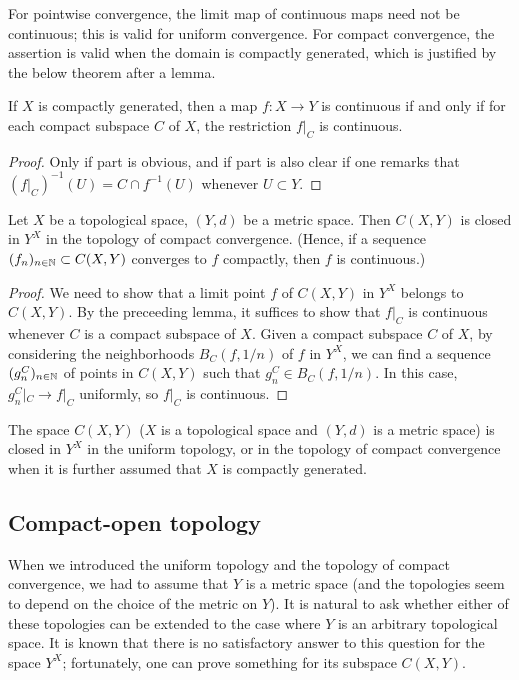 For pointwise convergence, the limit map of continuous maps need not be continuous; this is valid for uniform convergence.
For compact convergence, the assertion is valid when the domain is compactly generated, which is justified by the below theorem after a lemma.
\begin{lem}
    If $X$ is compactly generated, then a map $f: X\rightarrow Y$ is continuous if and only if for each compact subspace $C$ of $X$, the restriction $f|_C$ is continuous.
\end{lem}
\begin{proof}
    Only if part is obvious, and if part is also clear if one remarks that $(f|_C)^{-1}(U)=C\cap f^{-1}(U)$ whenever $U\subset Y$.
\end{proof}
\begin{thm}
    Let $X$ be a topological space, $(Y, d)$ be a metric space.
    Then $C(X, Y)$ is closed in $Y^X$ in the topology of compact convergence.
    (Hence, if a sequence $(f_n)_{n\in{\mathbb{N}}}\subset C(X, Y)$ converges to $f$ compactly, then $f$ is continuous.)
\end{thm}
\begin{proof}
    We need to show that a limit point $f$ of $C(X, Y)$ in $Y^X$ belongs to $C(X, Y)$.
    By the preceeding lemma, it suffices to show that $f|_C$ is continuous whenever $C$ is a compact subspace of $X$.
    Given a compact subspace $C$ of $X$, by considering the neighborhoods $B_C(f, 1/n)$ of $f$ in $Y^X$, we can find a sequence $(g_n^C)_{n\in{\mathbb{N}}}$ of points in $C(X, Y)$ such that $g_n^C\in B_C(f, 1/n)$.
    In this case, $g_n^C|_C\rightarrow f|_C$ uniformly, so $f|_C$ is continuous.
\end{proof}
\begin{rmk}
    The space $C(X, Y)$ ($X$ is a topological space and $(Y, d)$ is a metric space) is closed in $Y^X$ in the uniform topology, or in the topology of compact convergence when it is further assumed that $X$ is compactly generated.
\end{rmk}

\subsection{Compact-open topology}

When we introduced the uniform topology and the topology of compact convergence, we had to assume that $Y$ is a metric space (and the topologies seem to depend on the choice of the metric on $Y$).
It is natural to ask whether either of these topologies can be extended to the case where $Y$ is an arbitrary topological space.
It is known that there is no satisfactory answer to this question for the space $Y^X$; fortunately, one can prove something for its subspace $C(X, Y)$.

